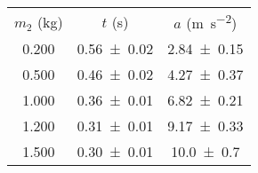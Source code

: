 \begin{table}
\begin{center}
\begin{ruledtabular}
\begin{tabular}{ccc}
$m_2$ (\unit{\kilo\gram}) & $t$ (\unit{\second}) & $a$ (\unit{\meter\per\second\squared}) \\ 
\colrule
\num{0.200} & \num{0.56\pm0.02} & \num{2.84\pm0.15} \\ 
\num{0.500} & \num{0.46\pm0.02} & \num{4.27\pm0.37} \\ 
\num{1.000} & \num{0.36\pm0.01} & \num{6.82\pm0.21} \\ 
\num{1.200} & \num{0.31\pm0.01} & \num{9.17\pm0.33} \\ 
\num{1.500} & \num{0.30\pm0.01} & \num{10.0\pm0.7} \\ 
\end{tabular}
\end{ruledtabular}
\end{center}
\end{table}
